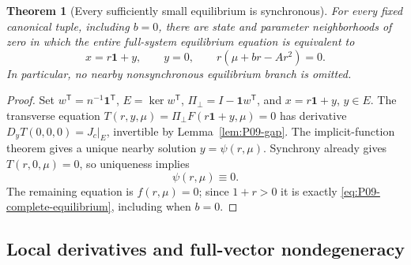 \documentclass[11pt]{article}
\newcommand{\one}{\mathbf{1}}
\newtheorem{theorem}{Theorem}[section]
\theoremstyle{definition}
\theoremstyle{remark}
\begin{document}
\begin{theorem}[Every sufficiently small equilibrium is synchronous]
\label{thm:P09-reduction}
For every fixed canonical tuple, including $b=0$, there are state and
parameter neighborhoods of zero in which the entire full-system
equilibrium equation is equivalent to
\begin{equation}
 x=r\one+y,\qquad y=0,\qquad r(\mu+br-Ar^2)=0.
 \label{eq:P09-complete-equilibrium}
\end{equation}
In particular, no nearby nonsynchronous equilibrium branch is omitted.
\end{theorem}
\begin{proof}
Set $w^{\mathsf T}=n^{-1}\one^{\mathsf T}$,
$E=\ker w^{\mathsf T}$, $\Pi_\perp=I-\one w^{\mathsf T}$,
and $x=r\one+y$, $y\in E$. The transverse equation
$T(r,y,\mu)=\Pi_\perp F(r\one+y,\mu)=0$ has derivative
$D_yT(0,0,0)=J_c|_E$, invertible by Lemma~\ref{lem:P09-gap}.
The implicit-function theorem \cite[Ch.~1]{GuckenheimerHolmes1983}
gives a unique nearby solution $y=\psi(r,\mu)$. Synchrony already
gives $T(r,0,\mu)=0$, so uniqueness implies
\begin{equation}\psi(r,\mu)\equiv0.\label{eq:P09-psi-zero}\end{equation}
The remaining equation is $f(r,\mu)=0$; since $1+r>0$ it is
exactly \eqref{eq:P09-complete-equilibrium}, including when $b=0$.
\end{proof}

\subsection{Local derivatives and full-vector nondegeneracy}
\end{document}
